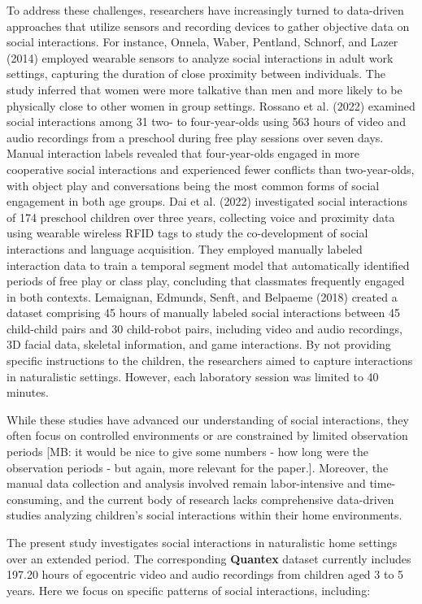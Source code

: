 \documentclass[
  man,floatsintext]{apa6}
\begin{document}
To address these challenges, researchers have increasingly turned to data-driven approaches that utilize sensors and recording devices to gather objective data on social interactions. For instance, Onnela, Waber, Pentland, Schnorf, and Lazer (2014) employed wearable sensors to analyze social interactions in adult work settings, capturing the duration of close proximity between individuals. The study inferred that women were more talkative than men and more likely to be physically close to other women in group settings. Rossano et al. (2022) examined social interactions among 31 two- to four-year-olds using 563 hours of video and audio recordings from a preschool during free play sessions over seven days. Manual interaction labels revealed that four-year-olds engaged in more cooperative social interactions and experienced fewer conflicts than two-year-olds, with object play and conversations being the most common forms of social engagement in both age groups. Dai et al. (2022) investigated social interactions of 174 preschool children over three years, collecting voice and proximity data using wearable wireless RFID tags to study the co-development of social interactions and language acquisition. They employed manually labeled interaction data to train a temporal segment model that automatically identified periods of free play or class play, concluding that classmates frequently engaged in both contexts. Lemaignan, Edmunds, Senft, and Belpaeme (2018) created a dataset comprising 45 hours of manually labeled social interactions between 45 child-child pairs and 30 child-robot pairs, including video and audio recordings, 3D facial data, skeletal information, and game interactions. By not providing specific instructions to the children, the researchers aimed to capture interactions in naturalistic settings. However, each laboratory session was limited to 40 minutes.

While these studies have advanced our understanding of social interactions, they often focus on controlled environments or are constrained by limited observation periods {[}MB: it would be nice to give some numbers - how long were the observation periods - but again, more relevant for the paper.{]}. Moreover, the manual data collection and analysis involved remain labor-intensive and time-consuming, and the current body of research lacks comprehensive data-driven studies analyzing children's social interactions within their home environments.

The present study investigates social interactions in naturalistic home settings over an extended period. The corresponding \textbf{Quantex} dataset currently includes 197.20 hours of egocentric video and audio recordings from children aged 3 to 5 years. Here we focus on specific patterns of social interactions, including:
\end{document}
